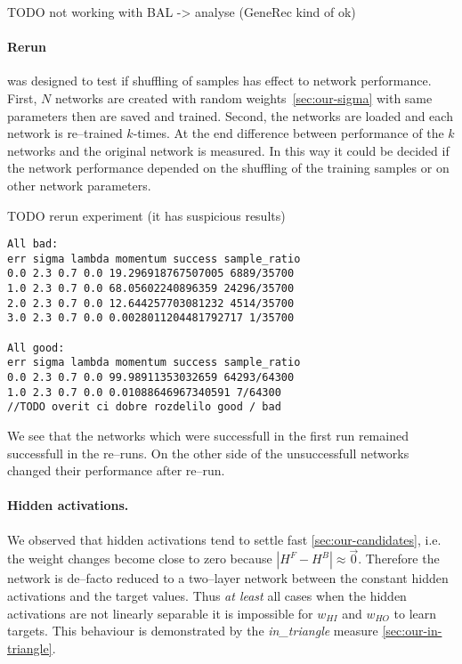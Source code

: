 TODO not working with BAL -> analyse (GeneRec kind of ok) 

\paragraph{Rerun} was designed to test if shuffling of samples has effect to network performance. First, $N$ networks are created with random weights~\ref{sec:our-sigma} with same parameters then are saved and trained. Second, the networks are loaded and each network is re--trained $k$-times. At the end difference between performance of the $k$ networks and the original network is measured. In this way it could be decided if the network performance depended on the shuffling of the training samples or on other network parameters. 

TODO rerun experiment (it has suspicious results) 

\begin{lstlisting}
All bad: 
err sigma lambda momentum success sample_ratio
0.0 2.3 0.7 0.0 19.296918767507005 6889/35700
1.0 2.3 0.7 0.0 68.05602240896359 24296/35700
2.0 2.3 0.7 0.0 12.644257703081232 4514/35700
3.0 2.3 0.7 0.0 0.0028011204481792717 1/35700

All good: 
err sigma lambda momentum success sample_ratio
0.0 2.3 0.7 0.0 99.98911353032659 64293/64300
1.0 2.3 0.7 0.0 0.01088646967340591 7/64300
//TODO overit ci dobre rozdelilo good / bad
\end{lstlisting}

We see that the networks which were successfull in the first run remained successfull in the re--runs. On the other side of the unsuccessfull networks changed their performance after re--run. 

\paragraph{Hidden activations.}
\label{sec:our-hidden-activation} 

We observed that hidden activations tend to settle fast \ref{sec:our-candidates}, i.e. the weight changes become close to zero because $|H^F - H^B| \approx \overrightarrow{0}$. Therefore the network is de--facto reduced to a two--layer network between the constant hidden activations and the target values. Thus \emph{at least} all cases when the hidden activations are not linearly separable it is impossible for $w_{HI}$ and $w_{HO}$ to learn targets. This behaviour is demonstrated by the \emph{in\_triangle} measure \ref{sec:our-in-triangle}. 

